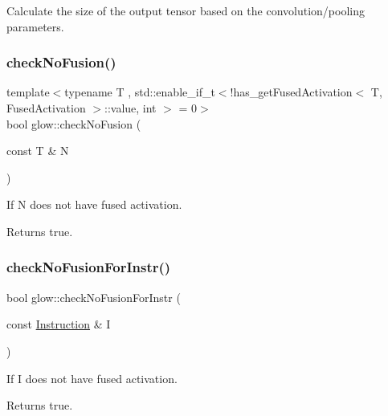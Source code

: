 Calculate the size of the output tensor based on the convolution/pooling parameters. \mbox{\label{namespaceglow_ab310f352073eee80ddb68b3cfaa14e12}} 
\subsubsection{\texorpdfstring{check\+No\+Fusion()}{checkNoFusion()}}
{\footnotesize\ttfamily template$<$typename T , std\+::enable\+\_\+if\+\_\+t$<$!has\+\_\+get\+Fused\+Activation$<$ T, Fused\+Activation $>$\+::value, int $>$  = 0$>$ \\
bool glow\+::check\+No\+Fusion (\begin{DoxyParamCaption}\item[{const T \&}]{N }\end{DoxyParamCaption})}



If {\ttfamily N} does not have fused activation. 

\begin{DoxyReturn}{Returns}
true. 
\end{DoxyReturn}
\mbox{\label{namespaceglow_a740e326204223c25d80b8b07e99dac18}} 
\subsubsection{\texorpdfstring{check\+No\+Fusion\+For\+Instr()}{checkNoFusionForInstr()}}
{\footnotesize\ttfamily bool glow\+::check\+No\+Fusion\+For\+Instr (\begin{DoxyParamCaption}\item[{const \hyperlink{classglow_1_1_instruction}{Instruction} \&}]{I }\end{DoxyParamCaption})}



If {\ttfamily I} does not have fused activation. 

\begin{DoxyReturn}{Returns}
true. 
\end{DoxyReturn}
\mbox{\label{namespaceglow_ad4ca93d79211ec0bc67ed8524634e69a}} 
